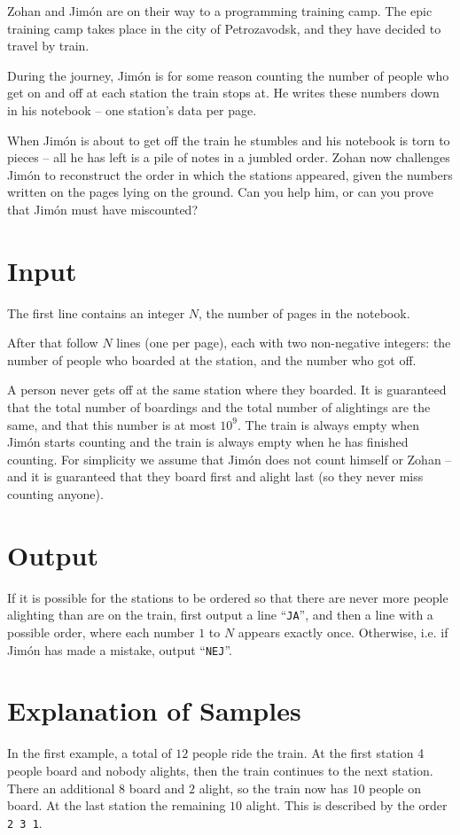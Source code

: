 
Zohan and Jimón are on their way to a programming training camp. The epic training camp takes place in the city of Petrozavodsk, and they have decided to travel by train.

During the journey, Jimón is for some reason counting the number of people who get on and off at each station the train stops at. He writes these numbers
down in his notebook -- one station's data per page.

When Jimón is about to get off the train he stumbles and his notebook is torn to pieces -- all he has left is a pile of notes in a jumbled order. Zohan now challenges
Jimón to reconstruct the order in which the stations appeared, given the numbers written on the pages lying on the ground. Can you help him, or can you prove that
Jimón must have miscounted?

\section*{Input}
The first line contains an integer $N$, the number of pages in the notebook.

After that follow $N$ lines (one per page), each with two non-negative
integers: the number of people who boarded at the station, and the number who
got off.

A person never gets off at the same station where they boarded. It is guaranteed that
the total number of boardings and the total number of
alightings are the same, and that this number is at most $10^9$. The train is always empty
when Jimón starts counting and the train is always empty when he has finished counting. For
simplicity we assume that Jimón does not count himself or Zohan -- and
it is guaranteed that they board first and alight last (so they never miss
counting anyone).

\section*{Output}
If it is possible for the stations to be ordered so that there are never more
people alighting than are on the train, first output a line
``\texttt{JA}'', and then a line with a possible order, where each number $1$ to
$N$ appears exactly once.
Otherwise, i.e. if Jimón has made a mistake, output ``\texttt{NEJ}''.

\section*{Explanation of Samples}
In the first example, a total of $12$ people ride the train. At the first station
4 people board and nobody alights, then the train continues to
the next station. There an additional $8$ board and $2$ alight, so the train now has $10$
people on board. At the last station the remaining $10$ alight. This is described by the order
\texttt{2 3 1}.

